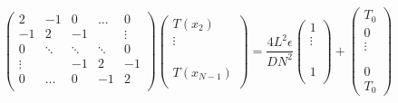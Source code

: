     \begin{equation} 
	\begin{pmatrix}
	2    & -1    & 0      & \dots  & 0   \\
	-1   & 2     & -1     &        &\vdots \\
	0    &\ddots & \ddots & \ddots &  0\\
	\vdots&      &    -1  &    2   & -1\\
	0    & \dots &0       &    -1  &  2 \\
	\end{pmatrix} %
	\begin{pmatrix}
	T(x_2)\\
	\vdots \\
	\\ \\ \\
	T(x_{N-1})\\
	\end{pmatrix} %
	= \frac{4L^2 \epsilon}{D N^2}
	\begin{pmatrix}
	1 \\
	\vdots \\ \\ \\ \\
	1 \\
	\end{pmatrix}
	+ \begin{pmatrix}
	T_0 \\
	0\\ \vdots \\ \\ \\ 0\\
	T_0 
	\end{pmatrix}
	\end{equation}
